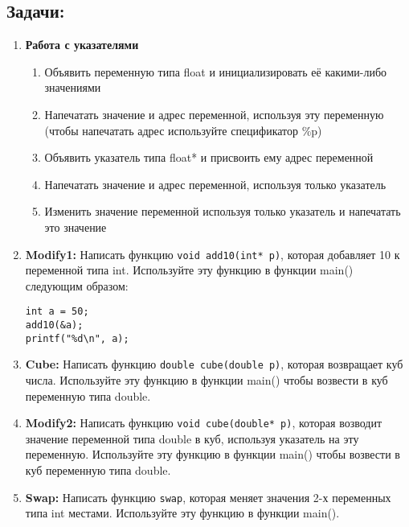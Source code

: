 \documentclass{article}
\begin{document}
\subsection*{Задачи:}
\begin{enumerate}
\item \textbf{Работа с указателями}
	\begin{enumerate}
	\item Объявить переменную типа float и инициализировать её какими-либо значениями
	\item Напечатать значение и адрес переменной, используя эту переменную (чтобы напечатать адрес используйте спецификатор \%p)
	\item Объявить указатель типа float* и присвоить ему адрес переменной
	\item Напечатать значение и адрес переменной, используя только указатель
	\item Изменить значение переменной используя только указатель и напечатать это значение
	\end{enumerate}

\item \textbf{Modify1:} Написать функцию \texttt{void add10(int* p)}, которая добавляет 10 к переменной типа int. Используйте эту функцию в функции main() следующим образом:
\begin{verbatim}
int a = 50;
add10(&a);
printf("%d\n", a);
\end{verbatim}
\item \textbf{Cube:} Написать функцию \texttt{double cube(double p)}, которая возвращает куб числа. Используйте эту функцию в функции main() чтобы возвести в куб переменную типа double.
\item \textbf{Modify2:} Написать функцию \texttt{void cube(double* p)}, которая возводит значение переменной типа double в куб, используя указатель на эту переменную. Используйте эту функцию в функции main() чтобы возвести в куб переменную типа double.
\item \textbf{Swap:} Написать функцию \texttt{swap}, которая меняет значения 2-х переменных типа int местами. Используйте эту функцию в функции main().
\end{enumerate}


\newpage
\end{document}
